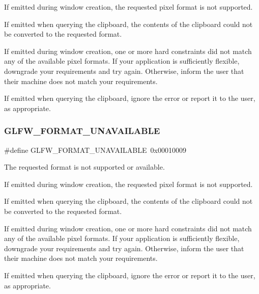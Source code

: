 If emitted during window creation, the requested pixel format is not supported.

If emitted when querying the clipboard, the contents of the clipboard could not be converted to the requested format.

If emitted during window creation, one or more hard constraints did not match any of the available pixel formats. If your application is sufficiently flexible, downgrade your requirements and try again. Otherwise, inform the user that their machine does not match your requirements.

\begin{DoxyParagraph}{}
If emitted when querying the clipboard, ignore the error or report it to the user, as appropriate. 
\end{DoxyParagraph}
\mbox{\label{group__errors_ga196e125ef261d94184e2b55c05762f14}} 
\subsubsection{\texorpdfstring{G\+L\+F\+W\+\_\+\+F\+O\+R\+M\+A\+T\+\_\+\+U\+N\+A\+V\+A\+I\+L\+A\+B\+LE}{GLFW\_FORMAT\_UNAVAILABLE}\hspace{0.1cm}{\footnotesize\ttfamily [2/5]}}
{\footnotesize\ttfamily \#define G\+L\+F\+W\+\_\+\+F\+O\+R\+M\+A\+T\+\_\+\+U\+N\+A\+V\+A\+I\+L\+A\+B\+LE~0x00010009}



The requested format is not supported or available. 

If emitted during window creation, the requested pixel format is not supported.

If emitted when querying the clipboard, the contents of the clipboard could not be converted to the requested format.

If emitted during window creation, one or more hard constraints did not match any of the available pixel formats. If your application is sufficiently flexible, downgrade your requirements and try again. Otherwise, inform the user that their machine does not match your requirements.

\begin{DoxyParagraph}{}
If emitted when querying the clipboard, ignore the error or report it to the user, as appropriate. 
\end{DoxyParagraph}
\mbox{\label{group__errors_ga196e125ef261d94184e2b55c05762f14}} 
